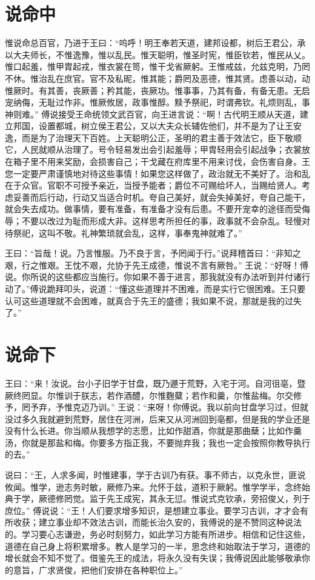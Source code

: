 \documentclass[a4paper,12pt,UTF8,twoside]{ctexbook}
\begin{document}
\chapter{说命中}

惟说命总百官，乃进于王曰：“呜呼！明王奉若天道，建邦设都，树后王君公，承以大夫师长，不惟逸豫，惟以乱民。惟天聪明，惟圣时宪，惟臣钦若，惟民从乂。惟口起羞，惟甲胄起戎，惟衣裳在笥，惟干戈省厥躬。王惟戒兹，允兹克明，乃罔不休。惟治乱在庶官。官不及私昵，惟其能；爵罔及恶德，惟其贤。虑善以动，动惟厥时。有其善，丧厥善；矜其能，丧厥功。惟事事，乃其有备，有备无患。无启宠纳侮，无耻过作非。惟厥攸居，政事惟醇。黩予祭祀，时谓弗钦。礼烦则乱，事神则难。”
傅说接受王命统领文武百官，向王进言说：“啊！古代明王顺从天道，建立邦国，设置都城，树立侯王君公，又以大夫众长辅佐他们，并不是为了让王安逸，而是为了治理天下百姓。上天聪明公正，圣明的君主善于效法它，臣下敬顺它，人民就顺从治理了。号令轻易发出会引起羞辱；甲胄轻用会引起战争；衣裳放在箱子里不用来奖励，会损害自己；干戈藏在府库里不用来讨伐，会伤害自身。王您一定要严肃谨慎地对待这些事情！如果您这样做了，政治就无不美好了。治和乱在于众官。官职不可授予亲近，当授予能者；爵位不可赐给坏人，当赐给贤人。考虑妥善而后行动，行动又当适合时机。夸自己美好，就会失掉美好，夸自己能干，就会失去成功。做事情，要有准备，有准备才没有后患。不要开宠幸的途径而受侮辱；不要以改过为耻而形成大非。这样思考所担任的事，政事就不会杂乱。轻慢对待祭祀，这叫不敬。礼神繁琐就会乱，这样，事奉鬼神就难了。”

王曰：“旨哉！说。乃言惟服。乃不良于言，予罔闻于行。”说拜稽首曰：“非知之艰，行之惟艰。王忱不艰，允协于先王成德，惟说不言有厥咎。”
王说：“好呀！傅说。你所说的这些都应当施行。你如果不善于进言，那我就没有办法听到并付诸行动了。”傅说跪拜叩头，说道：“懂这些道理并不困难，而是实行它很困难。王只要认可这些道理就不会困难，就真合于先王的盛德；我如果不说，那就是我的过失了。”

\chapter{说命下}

王曰：“来！汝说。台小子旧学于甘盘，既乃遯于荒野，入宅于河。自河徂亳，暨厥终罔显。尔惟训于朕志，若作酒醴，尔惟麴糵；若作和羹，尔惟盐梅。尔交修予，罔予弃，予惟克迈乃训。”
王说：“来呀！你傅说。我以前向甘盘学习过，但就没过多久我就避到荒野，居住在河洲，后来又从河洲回到亳都，但是我的学业还是没有什么长进。你当顺从我想学的志愿，比如作甜酒，你就是那曲蘖；比如作羹汤，你就是那盐和梅。你要多方指正我，不要抛弃我；我也一定会按照你教导执行的去。”

说曰：“王，人求多闻，时惟建事，学于古训乃有获。事不师古，以克永世，匪说攸闻。惟学，逊志务时敏，厥修乃来。允怀于兹，道积于厥躬。惟学学半，念终始典于学，厥德修罔觉。监于先王成宪，其永无愆。惟说式克钦承，旁招俊乂，列于庶位。”
傅说说：“王！人们要求增多知识，是想建立事业。要学习古训，才才会有所收获；建立事业却不效法古训，而能长治久安的，我傅说的是不赞同这种说法的。学习要心志谦逊，务必时刻努力，如此学习方能有所进步。相信和记住这些，道德在自己身上将积累增多。教人是学习的一半，思念终和始取法于学习，道德的增长就会不知不觉了。借鉴先王的成法，将永久没有失误；我傅说因此能够敬承你的意旨，广求贤俊，把他们安排在各种职位上。”
\end{document}
